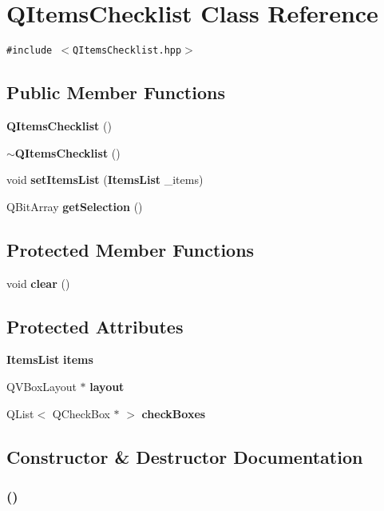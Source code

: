 \section{QItems\-Checklist Class Reference}
\label{classQItemsChecklist}
{\tt \#include $<$QItems\-Checklist.hpp$>$}

\subsection*{Public Member Functions}
\begin{CompactItemize}
\item 
{\bf QItems\-Checklist} ()
\item 
{\bf $\sim$QItems\-Checklist} ()
\item 
void {\bf set\-Items\-List} ({\bf Items\-List} \_\-items)
\item 
QBit\-Array {\bf get\-Selection} ()
\end{CompactItemize}
\subsection*{Protected Member Functions}
\begin{CompactItemize}
\item 
void {\bf clear} ()
\end{CompactItemize}
\subsection*{Protected Attributes}
\begin{CompactItemize}
\item 
{\bf Items\-List} {\bf items}
\item 
QVBox\-Layout $\ast$ {\bf layout}
\item 
QList$<$ QCheck\-Box $\ast$ $>$ {\bf check\-Boxes}
\end{CompactItemize}


\subsection{Constructor \& Destructor Documentation}
\subsubsection{ ()}\label{classQItemsChecklist_a0}


